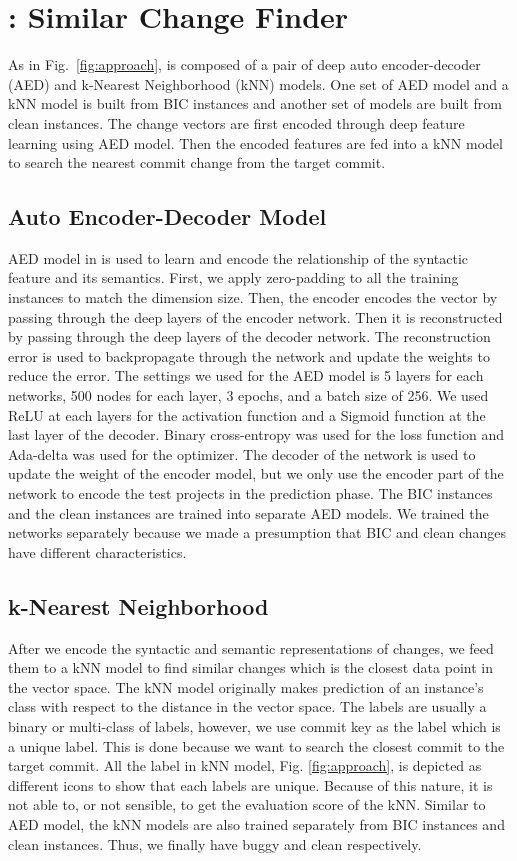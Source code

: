 \section{{\simfin}: Similar Change Finder}
As in Fig.~\ref{fig:approach}, {\simfin} is composed of a pair of deep auto encoder-decoder (AED) and k-Nearest Neighborhood (kNN) models.
One set of AED model and a kNN model is built from BIC instances and another set of models are built from clean instances. 
The change vectors are first encoded through deep feature learning using AED model.
Then the encoded features are fed into a kNN model to search the nearest commit change from the target commit.

\subsection{Auto Encoder-Decoder Model}
AED model in {\simfin} is used to learn and encode the relationship of the syntactic feature and its semantics.
First, we apply zero-padding to all the training instances to match the dimension size.
Then, the encoder encodes the vector by passing through the deep layers of the encoder network.
Then it is reconstructed by passing through the deep layers of the decoder network.
The reconstruction error is used to backpropagate through the network and update the weights to reduce the error.
The settings we used for the AED model is 5 layers for each networks, 500 nodes for each layer, 3 epochs, and a batch size of 256.
We used ReLU at each layers for the activation function and a Sigmoid function at the last layer of the decoder.
Binary cross-entropy was used for the loss function and Ada-delta was used for the optimizer.
The decoder of the network is used to update the weight of the encoder model, but we only use the encoder part of the network to encode the test projects in the prediction phase.
The BIC instances and the clean instances are trained into separate AED models.
We trained the networks separately because we made a presumption that BIC and clean changes have different characteristics.

\subsection{k-Nearest Neighborhood}
After we encode the syntactic and semantic representations of changes, we feed them to a kNN model to find similar changes which is the closest data point in the vector space.
The kNN model originally makes prediction of an instance's class with respect to the distance in the vector space.
The labels are usually a binary or multi-class of labels, however, we use commit key as the label which is a unique label.
This is done because we want to search the closest commit to the target commit.
All the label in kNN model, Fig. \ref{fig:approach}, is depicted as different icons to show that each labels are unique.
Because of this nature, it is not able to, or not sensible, to get the evaluation score of the kNN.
Similar to AED model, the kNN models are also trained separately from BIC instances and clean instances.
Thus, we finally have buggy {\simfin} and clean {\simfin} respectively.

